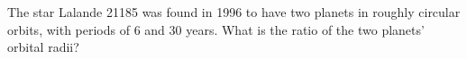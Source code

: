 The star Lalande 21185 was found in 1996 to have two planets in roughly
        circular orbits, with periods of 6 and 30 years. What is the ratio of the
        two planets' orbital radii?\answercheck
